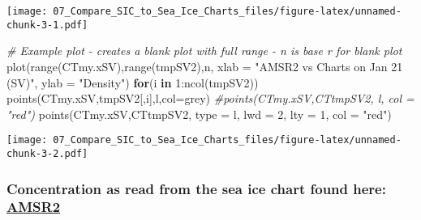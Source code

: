 \documentclass[
]{article}
\newenvironment{Shaded}{\begin{snugshade}}{\end{snugshade}}
\newcommand{\AttributeTok}[1]{\textcolor[rgb]{0.77,0.63,0.00}{#1}}
\newcommand{\CommentTok}[1]{\textcolor[rgb]{0.56,0.35,0.01}{\textit{#1}}}
\newcommand{\ControlFlowTok}[1]{\textcolor[rgb]{0.13,0.29,0.53}{\textbf{#1}}}
\newcommand{\DecValTok}[1]{\textcolor[rgb]{0.00,0.00,0.81}{#1}}
\newcommand{\FunctionTok}[1]{\textcolor[rgb]{0.00,0.00,0.00}{#1}}
\newcommand{\NormalTok}[1]{#1}
\newcommand{\SpecialCharTok}[1]{\textcolor[rgb]{0.00,0.00,0.00}{#1}}
\newcommand{\StringTok}[1]{\textcolor[rgb]{0.31,0.60,0.02}{#1}}
\begin{document}
\texttt{[image: 07\_Compare\_SIC\_to\_Sea\_Ice\_Charts\_files/figure-latex/unnamed-chunk-3-1.pdf]}

\begin{Shaded}
\begin{Highlighting}[]
\CommentTok{\# Example plot {-} creates a blank plot with full range {-} n is base r for blank plot}
\FunctionTok{plot}\NormalTok{(}\FunctionTok{range}\NormalTok{(CTmy.xSV),}\FunctionTok{range}\NormalTok{(tmpSV2),}\StringTok{\textquotesingle{}n\textquotesingle{}}\NormalTok{, }\AttributeTok{xlab =} \StringTok{"AMSR2 vs Charts on Jan 21 (SV)"}\NormalTok{, }\AttributeTok{ylab =} \StringTok{"Density"}\NormalTok{)}
\ControlFlowTok{for}\NormalTok{(i }\ControlFlowTok{in} \DecValTok{1}\SpecialCharTok{:}\FunctionTok{ncol}\NormalTok{(tmpSV2)) }\FunctionTok{points}\NormalTok{(CTmy.xSV,tmpSV2[,i],}\StringTok{\textquotesingle{}l\textquotesingle{}}\NormalTok{,}\AttributeTok{col=}\StringTok{\textquotesingle{}grey\textquotesingle{}}\NormalTok{)}
\CommentTok{\#points(CTmy.xSV,CTtmpSV2, \textquotesingle{}l\textquotesingle{}, col = "red")}
\FunctionTok{points}\NormalTok{(CTmy.xSV,CTtmpSV2, }\AttributeTok{type =} \StringTok{\textquotesingle{}l\textquotesingle{}}\NormalTok{, }\AttributeTok{lwd =} \DecValTok{2}\NormalTok{,  }\AttributeTok{lty =} \DecValTok{1}\NormalTok{, }\AttributeTok{col =} \StringTok{"red"}\NormalTok{)}
\end{Highlighting}
\end{Shaded}

\texttt{[image: 07\_Compare\_SIC\_to\_Sea\_Ice\_Charts\_files/figure-latex/unnamed-chunk-3-2.pdf]}

\hypertarget{concentration-as-read-from-the-sea-ice-chart-found-here-amsr2}{%
\subsubsection{\texorpdfstring{Concentration as read from the sea ice
chart found here:
\href{https://seaice.uni-bremen.de/databrowser/\#day=6\&month=2\&year=2023\&img=\%7B\%22image\%22\%3A\%22image-1\%22\%2C\%22product\%22\%3A\%22AMSR\%22\%2C\%22type\%22\%3A\%22visual\%22\%2C\%22region\%22\%3A\%22Antarctic3125\%22\%7D}{AMSR2}}{Concentration as read from the sea ice chart found here: AMSR2}}\label{concentration-as-read-from-the-sea-ice-chart-found-here-amsr2}}
\end{document}
